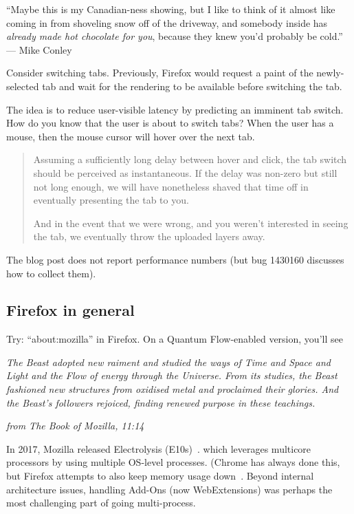\hfill ``Maybe this is my Canadian-ness showing, but I like to think of it almost like coming in from shoveling snow off of the driveway, and somebody inside has \emph{already made hot chocolate for you}, because they knew you’d probably be cold.'' --- Mike Conley

Consider switching tabs. Previously, Firefox would request a paint of the newly-selected tab and wait for the rendering to be available before switching the tab.

The idea is to reduce user-visible latency by predicting an imminent tab switch. How do you know that the user is about to switch tabs? When the user has a mouse, then the mouse cursor will hover over the next tab.

\begin{quote}
Assuming a sufficiently long delay between hover and click, the tab switch should be perceived as instantaneous. If the delay was non-zero but still not long enough, we will have nonetheless shaved that time off in eventually presenting the tab to you.

And in the event that we were wrong, and you weren’t interested in seeing the tab, we eventually throw the uploaded layers away.
\end{quote}

The blog post does not report performance numbers (but bug 1430160 discusses how to collect them).

\subsection*{Firefox in general}

Try: ``about:mozilla'' in Firefox. On a Quantum Flow-enabled version, you'll see

\begin{center}
\emph{The Beast adopted new raiment and studied the ways of Time and Space and Light and the Flow of energy through the Universe. From its studies, the Beast fashioned new structures from oxidised metal and proclaimed their glories. And the Beast’s followers rejoiced, finding renewed purpose in these teachings.}

\hfill \emph{from The Book of Mozilla, 11:14}
\end{center}

In 2017, Mozilla released Electrolysis (E10s)~\cite{electrolysis}.
which leverages multicore processors by using multiple OS-level
processes. (Chrome has always done this, but Firefox attempts to also
keep memory usage
down~\cite{goldilocks}.
Beyond internal architecture issues, handling Add-Ons (now
WebExtensions) was perhaps the most challenging part of going
multi-process.


